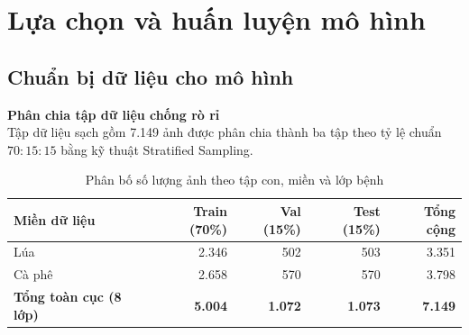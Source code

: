 \section{Lựa chọn và huấn luyện mô hình}

\subsection{Chuẩn bị dữ liệu cho mô hình}
\begin{frame}
    \textbf{Phân chia tập dữ liệu chống rò rỉ}\\
    \vspace{0.1cm}
    Tập dữ liệu sạch gồm 7.149 ảnh được phân chia thành ba tập theo tỷ lệ chuẩn $70:15:15$ bằng kỹ thuật Stratified Sampling.

    \vspace{0.2cm}
    \begin{table}[h]
        \centering
        \caption{Phân bố số lượng ảnh theo tập con, miền và lớp bệnh}
        \label{tab:slide_split_dist}
        \footnotesize
        \setlength{\tabcolsep}{10pt}
        \begin{tabular}{lrrrr}
            \toprule
            Miền dữ liệu                   & Train (70\%)   & Val (15\%)     & Test (15\%)    & Tổng cộng      \\
            \midrule
            Lúa                            & 2.346          & 502            & 503            & 3.351          \\
            Cà phê                         & 2.658          & 570            & 570            & 3.798          \\
            \midrule
            \textbf{Tổng toàn cục (8 lớp)} & \textbf{5.004} & \textbf{1.072} & \textbf{1.073} & \textbf{7.149} \\
            \bottomrule
        \end{tabular}
    \end{table}
\end{frame}

